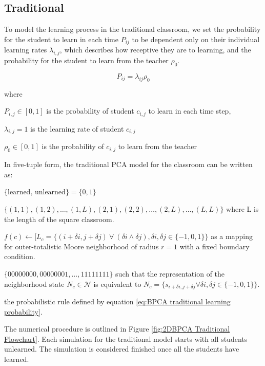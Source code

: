 \subsection{Traditional}
To model the learning process in the traditional classroom, we set the probability for the student to learn in each time $P_{ij}$ to be dependent only on their individual learning rates $\lambda_{i,j}$, which describes how receptive they are to learning, and the probability for the student to learn from the teacher $\rho_0$.

\begin{equation}
    \label{eq:BPCA traditional learning probability}
        P_{ij} = \lambda_{ij} \rho_{0}
\end{equation}

where

$P_{i,j} \in [0,1]$ is the probability of student $c_{i,j}$ to learn in each time step, 

$\lambda_{i,j} = 1$ is the learning rate of student $c_{i,j}$

$\rho_{0} \in [0,1]$ is the probability of $c_{i,j}$ to learn from the teacher

In five-tuple form, the traditional PCA model for the classroom can be written as:

\begin{CAdef}
\itemS $\lbrace \text{learned, unlearned} \rbrace = \lbrace 0, 1 \rbrace$

\itemC $\lbrace (1,1), (1,2), \dots, (1,L), (2, 1), (2,2), \dots, (2,L), \dots, (L,L)\rbrace$ where L is the length of the square classroom.

\itemL $f(c) \leftarrow \lbrack L_c = \lbrace (i+\delta i,j+\delta j) ~\forall~ (\delta i \land \delta j),  \delta i, \delta j \in \lbrace -1,0,1 \rbrace \rbrace $ as a mapping for outer-totalistic Moore neighborhood of radius $r=1$ with a fixed boundary condition.

\itemN $\lbrace 00000000, 00000001, \dots, 11111111 \rbrace$ such that the representation of the neighborhood state $N_c \in \mathcal{N}$ is equivalent to $N_c = \lbrace s_{i+\delta i, j+\delta j} \forall \delta i, \delta j \in \lbrace -1,0,1 \rbrace \rbrace$.

\itemR the probabilistic rule defined by equation \ref{eq:BPCA traditional learning probability}.
\end{CAdef}

The numerical procedure is outlined in Figure \ref{fig:2DBPCA Traditional Flowchart}. Each simulation for the traditional model starts with all students unlearned. The simulation is considered finished once all the students have learned.


